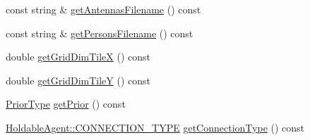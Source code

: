 \begin{DoxyCompactItemize}
\item 
const string \& \mbox{\hyperlink{class_world_a5baa256a1e856e635830e0a1c9cce37b}{get\+Antennas\+Filename}} () const
\item 
const string \& \mbox{\hyperlink{class_world_a206508d427e13c242855d9e11e5bed72}{get\+Persons\+Filename}} () const
\item 
double \mbox{\hyperlink{class_world_aa62f6cd42214191e37b904a672306888}{get\+Grid\+Dim\+TileX}} () const
\item 
double \mbox{\hyperlink{class_world_a99a004c6f3ce1a3a76894bb1f9625bbe}{get\+Grid\+Dim\+TileY}} () const
\item 
\mbox{\hyperlink{_prior_type_8h_a61286c562e68de246982fc393a7c23a5}{Prior\+Type}} \mbox{\hyperlink{class_world_a9d7c2f5e7d357b891fac1728a932885f}{get\+Prior}} () const
\item 
\mbox{\hyperlink{class_holdable_agent_ae2c334b004d7b9c5a999cf2618e4e518}{Holdable\+Agent\+::\+C\+O\+N\+N\+E\+C\+T\+I\+O\+N\+\_\+\+T\+Y\+PE}} \mbox{\hyperlink{class_world_a35aafc469b9146b4b6f72c6adaa3e067}{get\+Connection\+Type}} () const
\end{DoxyCompactItemize}
